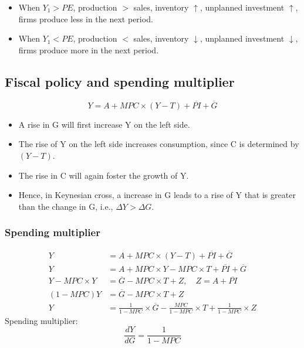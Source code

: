 \documentclass[10pt]{article}
\begin{document}
\begin{itemize}
\item When $ Y_1 > PE $, production $ > $  sales, inventory $ \uparrow $, 
		unplanned investment $ \uparrow $, firms produce less in the next period.
\item When $ Y_1 < PE $, production $ < $  sales, inventory $ \downarrow $, 
		unplanned investment $ \downarrow $, firms produce more in the next period.
\end{itemize}



\subsection{Fiscal policy and spending multiplier}
\begin{equation*}
		Y = A + MPC  \times (Y - T) +  \overline{PI} +  \overline{G}  
\end{equation*}
\begin{itemize}
\item A rise in G will first increase Y on the left side.
\item The rise of Y on the left side increases consumption, since C is determined by
		$ (Y - T) $.
\item The rise in C will again foster the growth of Y.
\item Hence, in Keynesian cross, a increase in G leads to a rise of Y that is greater
		than the change in G, i.e., $ \Delta Y > \Delta G $.
\end{itemize}


\subsubsection{Spending multiplier}
\begin{align*}
		Y &= A + MPC  \times (Y - T) +  \overline{PI} +  \overline{G}  \\
		Y &= A + MPC  \times Y  - MPC  \times  T +  \overline{PI} +  \overline{G}  \\
		Y  -  MPC  \times Y &=  \overline{G}  - MPC  \times T + Z, \quad Z = A +  \overline{PI}\\
		(1 - MPC)Y &=  \overline{G} - MPC  \times T + Z\\
		Y&= \frac{1}{1 - MPC}   \times \overline{G} - \frac{MPC}{1 - MPC} \times T + 
		\frac{1}{1 - MPC} \times  Z
\end{align*}
Spending multiplier:
\begin{equation*}
\frac{dY}{dG} = \frac{1}{1 - MPC}
\end{equation*}
\end{document}
